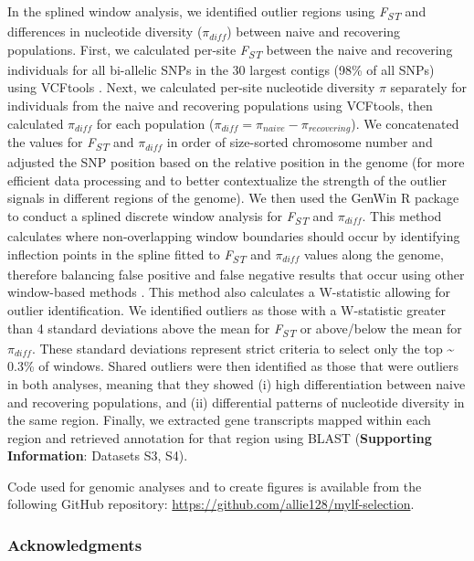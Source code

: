 \documentclass[
  letterpaper,
  DIV=11,
  numbers=noendperiod]{scrartcl}
\begin{document}
In the splined window analysis, we identified outlier regions using
\emph{F\textsubscript{ST}} and differences in nucleotide diversity
(\(\pi_{diff}\)) between naive and recovering populations. First, we
calculated per-site \emph{F\textsubscript{ST}} between the naive and
recovering individuals for all bi-allelic SNPs in the 30 largest contigs
(98\% of all SNPs) using VCFtools \citep{danecek2011}. Next, we
calculated per-site nucleotide diversity \(\pi\) separately for
individuals from the naive and recovering populations using VCFtools,
then calculated \(\pi_{diff}\) for each population
(\(\pi_{diff} = \pi_{naive} - \pi_{recovering}\)). We concatenated the
values for \emph{F\textsubscript{ST}} and \(\pi_{diff}\) in order of
size-sorted chromosome number and adjusted the SNP position based on the
relative position in the genome (for more efficient data processing and
to better contextualize the strength of the outlier signals in different
regions of the genome). We then used the GenWin R package
\citep{beissinger2015} to conduct a splined discrete window analysis for
\emph{F\textsubscript{ST}} and \(\pi_{diff}\). This method calculates
where non-overlapping window boundaries should occur by identifying
inflection points in the spline fitted to \emph{F\textsubscript{ST}} and
\(\pi_{diff}\) values along the genome, therefore balancing false
positive and false negative results that occur using other window-based
methods \citep{beissinger2015}. This method also calculates a
W-statistic allowing for outlier identification. We identified outliers
as those with a W-statistic greater than 4 standard deviations above the
mean for \emph{F\textsubscript{ST}} or above/below the mean for
\(\pi_{diff}\). These standard deviations represent strict criteria to
select only the top \textasciitilde{} 0.3\% of windows. Shared outliers
were then identified as those that were outliers in both analyses,
meaning that they showed (i) high differentiation between naive and
recovering populations, and (ii) differential patterns of nucleotide
diversity in the same region. Finally, we extracted gene transcripts
mapped within each region and retrieved annotation for that region using
BLAST (\textbf{Supporting Information}: Datasets S3, S4).

Code used for genomic analyses and to create figures is available from
the following GitHub repository:
\url{https://github.com/allie128/mylf-selection}.

\hypertarget{acknowledgments}{%
\subsubsection{Acknowledgments}\label{acknowledgments}}
\end{document}
